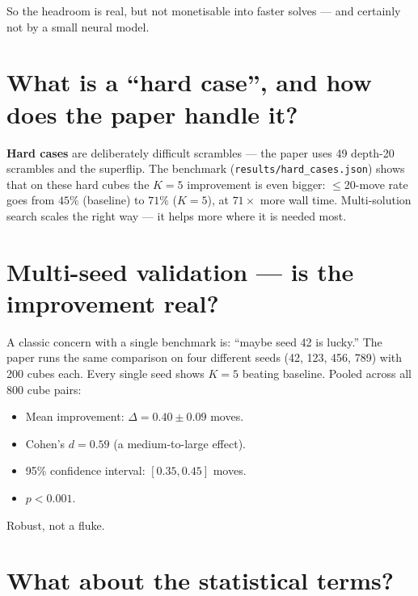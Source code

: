 \documentclass[11pt,a4paper]{article}
\newcommand{\defn}[1]{\textbf{#1}}
\begin{document}
So the headroom is real, but not monetisable into faster solves
--- and certainly not by a small neural model.

\section{What is a ``hard case'', and how does the paper handle it?}

\defn{Hard cases} are deliberately difficult scrambles --- the paper
uses 49 depth-20 scrambles and the superflip. The benchmark
(\texttt{results/\allowbreak hard\_cases.json}) shows that on these
hard cubes the $K=5$ improvement is even bigger: $\leq$20-move rate
goes from $45\%$ (baseline) to $71\%$ ($K=5$), at $71\times$ more wall
time. Multi-solution search scales the right way --- it helps more
where it is needed most.

\section{Multi-seed validation --- is the improvement real?}

A classic concern with a single benchmark is: ``maybe seed 42 is
lucky.'' The paper runs the same comparison on four different seeds
(42, 123, 456, 789) with 200 cubes each. Every single seed shows
$K=5$ beating baseline. Pooled across all 800 cube pairs:

\begin{itemize}[leftmargin=2em]
  \item Mean improvement: $\Delta = 0.40 \pm 0.09$ moves.
  \item Cohen's $d = 0.59$ (a medium-to-large effect).
  \item 95\% confidence interval: $[0.35, 0.45]$ moves.
  \item $p < 0.001$.
\end{itemize}

Robust, not a fluke.

\section{What about the statistical terms?}
\end{document}
